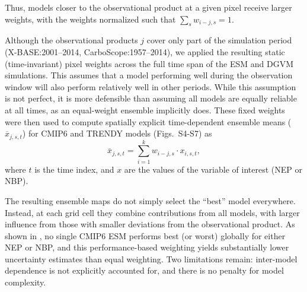 \documentclass[ProofPDF]{./Styles/Jnls-Template-V3}
\begin{document}
Thus, models closer to the observational product at a given pixel receive larger weights, with the weights normalized such that $\sum_s w_{i-j, s}=1$.

Although the observational products $j$ cover only part of the simulation period (X-BASE:2001--2014, CarboScope:1957--2014), we applied the resulting static (time-invariant) pixel weights across the full time span of the ESM and DGVM simulations. This assumes that a model performing well during the observation window will also perform relatively well in other periods. While this assumption is not perfect, it is more defensible than assuming all models are equally reliable at all times, as an equal-weight ensemble implicitly does. These fixed weights were then used to compute spatially explicit time-dependent ensemble means ($\overline{x}_{j, s, t}$) for CMIP6 and TRENDY models (Figs.~S4-S7) as
\begin{equation}
   \overline{x}_{j, s, t} =\sum_{i=1}^{k}w_{i-j, s} \cdot x_{i, s, t},
\end{equation}
where $t$ is the time index, and $x$ are the values of the variable of interest (NEP or NBP).

The resulting ensemble maps do not simply select the “best” model everywhere. Instead, at each grid cell they combine contributions from all models, with larger influence from those with smaller deviations from the observational product. As shown in \citet{Sierra2025GDM}, no single CMIP6 ESM performs best (or worst) globally for either NEP or NBP, and this performance-based weighting yields substantially lower uncertainty estimates than equal weighting. Two limitations remain: inter-model dependence is not explicitly accounted for, and there is no penalty for model complexity.%
 


\end{document}
